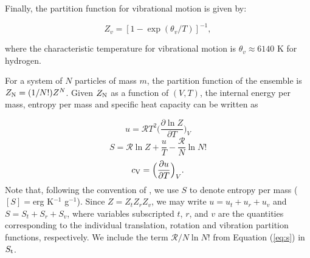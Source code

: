 Finally, the partition function for vibrational motion is given by:

\begin{equation}
\label{eq:Zv}
Z_v=[1-\exp{(\theta_v/T)}]^{-1},
\end{equation}

\noindent where the characteristic temperature for vibrational motion is $\theta_v  \approx 6140$ K for hydrogen. 

For a system of $N$ particles of mass $m$, the partition function of the ensemble is $Z_{\rm N}=(1/N!)Z^N$. Given $Z_{\rm N}$ as a function of $(V, T)$, the internal energy per mass, entropy per mass and specific heat capacity can be written as

%
%

\begin{equation}
\label{eq:u}
u=\mathcal{R}T^2 \Big(\frac{\partial \ln{Z}}{\partial T}\Big)_{V}
\end{equation}
\begin{equation}
\label{eq:s}
S=\mathcal{R} \ln{Z} + \frac{u}{T}-\frac{\mathcal{R}}{N} \ln N!
\end{equation}
\begin{equation}
\label{eq:cv}
c_{\rm V}=\Big(\frac{\partial u}{\partial T}\Big)_{V}.
\end{equation}
Note that, following the convention of \citet{saumon95}, we use $S$ to denote entropy per mass ($[S]=$erg K$^{-1}$ g$^{-1}$).  Since $Z=Z_t Z_r Z_v$, we may write $u=u_t+u_r+u_v$ and $S=S_t+S_r+S_v$, where variables subscripted $t$, $r$, and $v$ are the quantities corresponding to the individual translation, rotation and vibration partition functions, respectively. We include the term $\mathcal{R}/N \ln N!$ from Equation (\ref{eq:s}) in $S_{\rm t}$.


